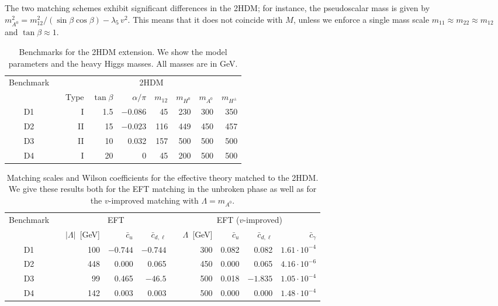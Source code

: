 The two matching schemes exhibit significant differences in the 2HDM;
for instance, the pseudoscalar mass is given by $m^2_{A^0} =
m_{12}^2/(\sin\beta\cos\beta) -\lambda_5\,v^2$. This means that it
does not coincide with $M$, unless we enforce a single mass scale
$m_{11} \approx m_{22} \approx m_{12}$ and $\tan \beta \approx
1$.

\begin{table}[t] \renewcommand{\arraystretch}{1.2} \centering
  \begin{tabular}{c c rrrrrrr } \toprule \multirow{2}{*}{Benchmark}
&\hspace*{1em}& \multicolumn{7}{c}{2HDM} \\ \cmidrule{3-9} && Type &
$\tan\beta$ & $\alpha/\pi$ & $m_{12} $ & $m_{H^0} $ & $m_{A^0} $ &
$m_{H^\pm}$ \\ \midrule D1 && I & 1.5 & $-0.086$ & 45 & 230 & 300 &
350 \\ D2 && II & 15 & $-0.023$ & 116 & 449 & 450 & 457 \\ D3 && II &
10 & 0.032 & 157 & 500 & 500 & 500 \\ D4 && I & 20 & 0 & 45 & 200 &
500 & 500 \\ \bottomrule
  \end{tabular}
 \caption{Benchmarks for the 2HDM extension. We show the model
parameters and the heavy Higgs masses. All masses are in GeV.}
 \label{tab:2hdm_benchmarks}
\end{table}

\begin{table}[b!]  \renewcommand{\arraystretch}{1.2} \centering
  \begin{tabular}{c c rrr c rrrr} \toprule \multirow{2}{*}{Benchmark}
&\hspace*{1em}& \multicolumn{3}{c}{EFT} &\hspace*{1em}&
\multicolumn{4}{c}{EFT ($v$-improved)} \\ \cmidrule{3-5}
\cmidrule{7-10} && $|\Lambda|$~[GeV] & $\bar{c}_u$ &
$\bar{c}_{d,\ell}$ && $\Lambda$~[GeV] & $\bar{c}_u$ &
$\bar{c}_{d,\ell}$ & $\bar{c}_\gamma$ \\ \midrule D1 && 100 & $-0.744$
& $-0.744$ && 300 & 0.082 & 0.082 & $1.61 \cdot 10^{-4}$ \\ D2 && 448
& 0.000 & 0.065 && 450 & 0.000 & 0.065 & $4.16 \cdot 10^{-6}$ \\ D3 &&
99 & 0.465 & $-46.5$ && 500 & 0.018 & $-1.835$ & $1.05 \cdot 10^{-4}$
\\ D4 && 142 & 0.003 & 0.003 && 500 & 0.000 & 0.000 & $1.48 \cdot
10^{-4}$ \\ \bottomrule
  \end{tabular}
 \caption{Matching scales and Wilson coefficients for the effective
theory matched to the 2HDM. We give these results both for the EFT
matching in the unbroken phase as well as for the $v$-improved
matching with $\Lambda = m_{A^0}$.}
 \label{tab:2hdm_EFT}
\end{table}


